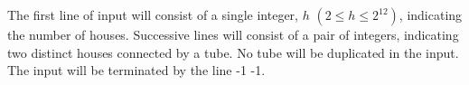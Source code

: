 The first line of input will consist of a single integer, $h$ $(2 \le h \le 2^{12})$, indicating the number of houses. Successive lines will consist of a pair of integers, indicating two distinct houses connected by a tube. No tube will be duplicated in the input. The input will be terminated by the line -1 -1.
